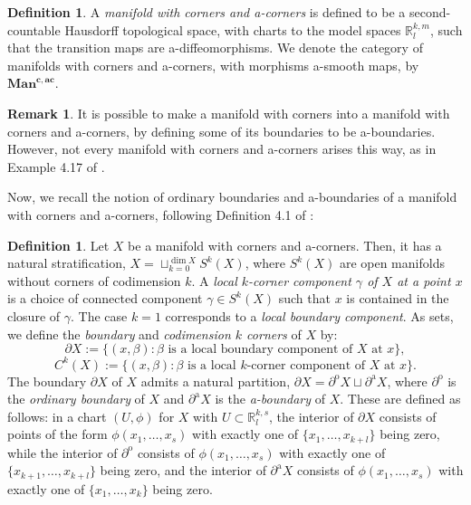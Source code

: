 \documentclass[10pt, a4paper]{article}
\theoremstyle{plain}%
\theoremstyle{definition}
\newtheorem{defn}[theorem]{Definition}
\newtheorem{rem}[theorem]{Remark}
\numberwithin{figure}{section}
\numberwithin{equation}{section}
\newcommand{\bR}{\mathbb{R}}
\newcommand{\pa}{\partial}
\newcommand{\mancac}{\mathbf{Man}^{\mathbf{c,ac}}}
\begin{document}
\begin{defn}
	A \textit{manifold with corners and a-corners} is defined to be a second-countable Hausdorff topological space, with charts to the model spaces $\bR^{k,m}_l$, such that the transition maps are a-diffeomorphisms. We denote the category of manifolds with corners and a-corners, with morphisms a-smooth maps, by $\mancac$. 
\end{defn}

\begin{rem}
	It is possible to make a manifold with corners into a manifold with corners and a-corners, by defining some of its boundaries to be a-boundaries. However, not every manifold with corners and a-corners arises this way, as in Example 4.17 of \cite{Joy16}.
\end{rem}

Now, we recall the notion of ordinary boundaries and a-boundaries of a manifold with corners and a-corners, following Definition 4.1 of \cite{Joy16}:

\begin{defn}
Let $X$ be a manifold with corners and a-corners. Then, it has a natural stratification, $X= \sqcup_{k=0}^{\dim X} S^k(X)$, where $S^k(X)$ are open manifolds without corners of codimension $k$. A \textit{local $k$-corner component $\gamma$ of $X$ at a point $x$} is a choice of connected component $\gamma \in S^k(X)$ such that $x$ is contained in the closure of $\gamma$. The case $k=1$ corresponds to a \textit{local boundary component}. As sets, we define the \textit{boundary} and \textit{codimension $k$ corners} of $X$ by:
\[
\pa X := \{ (x,\beta): \beta \textrm{ is a local boundary component of $X$ at $x$}\},
\]
\[
C^k(X):= \{(x,\beta): \beta \textrm{ is a local $k$-corner component of $X$ at $x$}\}.
\]
The boundary $\pa X$ of $X$ admits a natural partition, $\pa X = \pa^{\textrm{o}}X \sqcup \pa^{\textrm{a}}X$, where $\pa^{\textrm{o}}$ is the \textit{ordinary boundary} of $X$ and $\pa^{\textrm{a}}X$ is the \textit{a-boundary} of $X$. These are defined as follows: in a chart $(U,\phi)$ for $X$ with $U\subset \bR^{k,s}_l$, the interior of $\pa X$ consists of points of the form $\phi(x_1,\dots,x_s)$ with exactly one of $\{x_1,\dots,x_{k+l}\}$ being zero, while the interior of $\pa^\textrm{o}$ consists of $\phi(x_1,\dots,x_s)$ with exactly one of $\{x_{k+1},\dots,x_{k+l}\}$ being zero, and the interior of $\pa^{\textrm{a}}X$ consists of $\phi(x_1,\dots,x_s)$ with exactly one of $\{x_1,\dots,x_k\}$ being zero.  
\end{defn}
\end{document}
